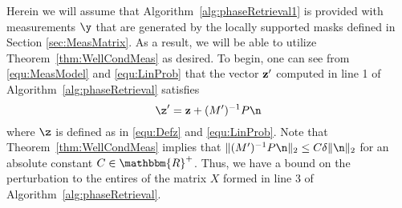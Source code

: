 
Herein we will assume that Algorithm~\ref{alg:phaseRetrieval1} is provided with measurements $\y$ that are generated by the locally supported masks defined in  Section \ref{sec:MeasMatrix}.  As a result, we will be able to utilize Theorem~\ref{thm:WellCondMeas} as desired.  To begin, one can see from \eqref{equ:MeasModel} and \eqref{equ:LinProb} that the vector ${\bf z}'$ computed in line 1 of Algorithm~\ref{alg:phaseRetrieval} satisfies  
\begin{equation}
\z' = {\bf z} + (M')^{-1} P \n
\label{equ:InvertedNoiseyMeas}
\end{equation}
where $\z$ is defined as in \eqref{equ:Defz} and \eqref{equ:LinProb}.  Note that Theorem~\ref{thm:WellCondMeas} implies that $\|  (M')^{-1} P \n \|_2 \leq C \delta \|  \n \|_2$ for an absolute constant $C \in \mathbbm{R}^+$.  Thus, we have a bound on the perturbation to the entires of the matrix $X$ formed in line 3 of Algorithm~\ref{alg:phaseRetrieval}.

